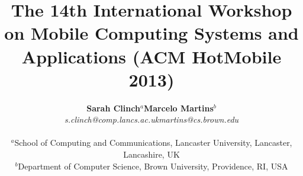 \documentclass[twocolumn,11pt,twoside]{article}
\newcommand{\reporttitle}{
    The 14th International Workshop on Mobile Computing Systems and Applications (ACM HotMobile 2013)
}
\begin{document}
\title{\reporttitle{}}

\author{
    \begin{tabular}{p{2in} p{1in} p{2in}}
        \multicolumn{1}{c}{\textbf{Sarah Clinch$^{a}$}} & & 
        \multicolumn{1}{c}{\textbf{Marcelo Martins$^{b}$}} \\
        \multicolumn{1}{c}{\textit{s.clinch@comp.lancs.ac.uk}} & & 
        \multicolumn{1}{c}{\textit{martins@cs.brown.edu}}
    \end{tabular}\\
    $^{a}$School of Computing and Communications, Lancaster University, Lancaster, Lancashire, UK\\
    $^{b}$Department of Computer Science, Brown University, Providence, RI, USA\\
    \\
}

\maketitle
\thispagestyle{fancy}
\normalfont


\remarktrue















\begin{small}


\end{small}
\end{document}
